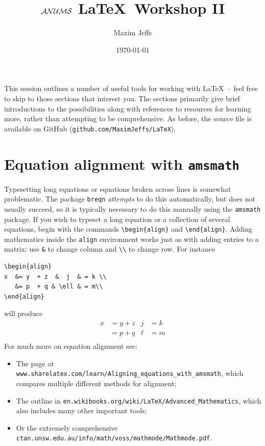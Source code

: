 \documentclass[10pt]{article}
\title{\textbf{$\mathcal{ANUMS}$ \LaTeX\ Workshop II}}
\author{Maxim Jeffs}
\date{\today}
\newcommand{\eqn}[1]{\begin{align*} #1 \end{align*}}
\begin{document}
\maketitle

This session outlines a number of useful tools for working with \LaTeX\ -- feel free to skip to those sections that interest you. The sections primarily give brief introductions to the possibilities along with references to resources for learning more, rather than attempting to be comprehensive. As before, the source file is available on GitHub (\verb$github.com/MaximJeffs/LaTeX$).

\section{Equation alignment with \texttt{amsmath}}

Typesetting long equations or equations broken across lines is somewhat problematic. The package \texttt{breqn} \textit{attempts} to do this automatically, but does not usually succeed, so it is typically necessary to do this manually using the \verb$amsmath$ package. If you wish to typeset a long equation or a collection of several equations, begin with the commands \verb$\begin{align}$ and \verb$\end{align}$. Adding mathematics inside the \texttt{align} environment works just as with adding entries to a matrix: use \verb$&$ to change column and \verb$\\$ to change row. For instance
\begin{verbatim}
\begin{align}
x  &= y  + z  &  j  & = k \\
   &= p  + q & \ell & = m\\
\end{align}
\end{verbatim}
will produce
\eqn{
x  &= y  + z  &  j  & = k \\
    & = p  + q  & \ell & = m\\
}
For much more on equation alignment see: 
\begin{itemize}
\item The page at \verb$www.sharelatex.com/learn/Aligning_equations_with_amsmath$, which compares multiple different methods for alignment;
\item The outline in \verb$en.wikibooks.org/wiki/LaTeX/Advanced_Mathematics$, which also includes many other important tools;
\item Or the extremely comprehensive \verb$ctan.unsw.edu.au/info/math/voss/mathmode/Mathmode.pdf$. 
\end{itemize} 
\end{document}

